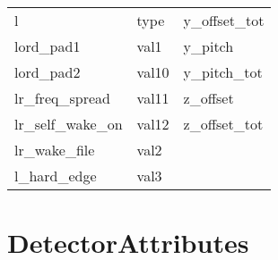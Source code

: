 \begin{tabular}{lll}
l                           & type                        & y_offset_tot                \\
lord_pad1                   & val1                        & y_pitch                     \\
lord_pad2                   & val10                       & y_pitch_tot                 \\
lr_freq_spread              & val11                       & z_offset                    \\
lr_self_wake_on             & val12                       & z_offset_tot                \\
lr_wake_file                & val2                        &                             \\
l_hard_edge                 & val3                        &                             \\
 \bottomrule
 \end{tabular}
 \vfill
 
 \section{DetectorAttributes}
 \label{s:list.detector}
 
